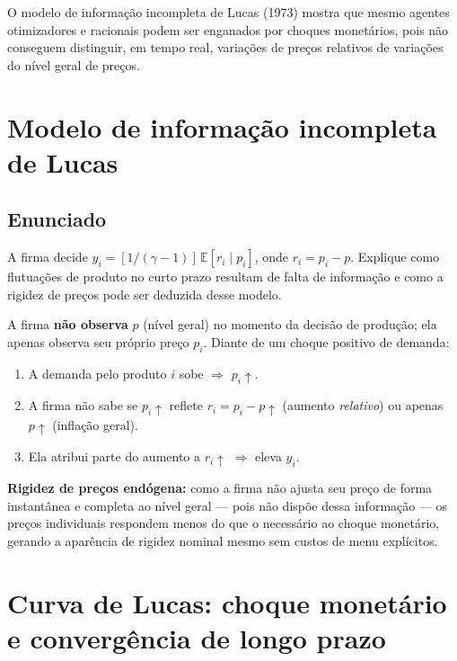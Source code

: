 \documentclass[12pt, a4paper]{article}
\newcommand{\E}{\mathbb{E}}
\begin{document}
O modelo de informação incompleta de Lucas (1973) mostra que mesmo agentes
otimizadores e racionais podem ser enganados por choques monetários, pois não
conseguem distinguir, em tempo real, variações de preços relativos de variações
do nível geral de preços.

\bigskip

\section{Modelo de informação incompleta de Lucas}

\subsection*{Enunciado}
A firma decide $y_i = [1/(\gamma-1)]\,\E[r_i \mid p_i]$, onde $r_i = p_i - p$.
Explique como flutuações de produto no curto prazo resultam de falta de informação
e como a rigidez de preços pode ser deduzida desse modelo.

\begin{resultbox}[title={Mecanismo de extração de sinal}]
A firma \textbf{não observa} $p$ (nível geral) no momento da decisão de produção;
ela apenas observa seu próprio preço $p_i$. Diante de um choque positivo de demanda:
\begin{enumerate}[leftmargin=1.5em, itemsep=2pt]
  \item A demanda pelo produto $i$ sobe $\Rightarrow$ $p_i \uparrow$.
  \item A firma não sabe se $p_i \uparrow$ reflete $r_i = p_i - p \uparrow$
    (aumento \emph{relativo}) ou apenas $p \uparrow$ (inflação geral).
  \item Ela atribui parte do aumento a $r_i \uparrow$ $\Rightarrow$ eleva $y_i$.
\end{enumerate}
\end{resultbox}

\textbf{Rigidez de preços endógena:} como a firma não ajusta seu preço de forma
instantânea e completa ao nível geral --- pois não dispõe dessa informação ---
os preços individuais respondem menos do que o necessário ao choque monetário,
gerando a aparência de rigidez nominal mesmo sem custos de menu explícitos.

\section{Curva de Lucas: choque monetário e convergência de longo prazo}
\end{document}
